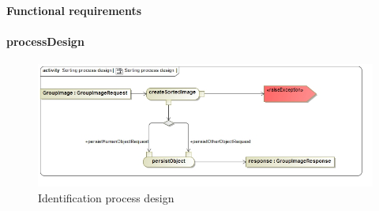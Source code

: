 \documentclass[a4paper,12pt]{report}
\begin{document}
			\FloatBarrier	
			\paragraph {Functional requirements}

			\FloatBarrier	
			\paragraph {processDesign}
			\begin{figure}[htb]
				\centering
				\includegraphics [scale=0.5]{../Diagrams/Sorting_process_design.jpg}
				\caption{Identification process design}
			\end{figure}	
\end{document}

